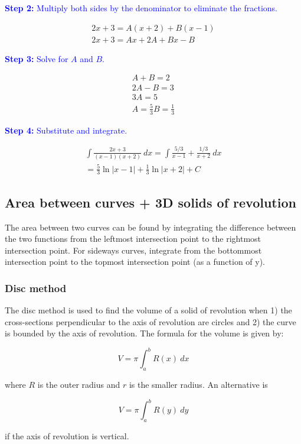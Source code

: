 \documentclass[letterpaper, 12pt]{article}
\newcommand{\step}[2]{\textcolor{blue}{\textbf{Step #1:} #2}}
\begin{document}
\step{2}{Multiply both sides by the denominator to eliminate the fractions.}

\begin{gather*}
2x+3 = A(x+2) + B(x-1) \\
2x + 3 = Ax + 2A + Bx - B
\end{gather*}

\step{3}{Solve for $A$ and $B$.}

\begin{gather*}
A + B = 2 \\
2A - B = 3 \\
3A = 5 \\
A = \frac{5}{3}
B = \frac{1}{3}
\end{gather*}

\step{4}{Substitute and integrate.}

\begin{gather*}
\int \frac{2x + 3}{(x-1)(x+2)} \: dx = \int \frac{5/3}{x-1} + \frac{1/3}{x+2} \: dx \\
= \boxed{\frac{5}{3} \ln|x-1| + \frac{1}{3} \ln|x+2| + C}
\end{gather*}

\subsection*{Area between curves + 3D solids of revolution}

The area between two curves can be found by integrating the difference between the two functions from the leftmost intersection point to the rightmost intersection point. For sideways curves, integrate from the bottommost intersection point to the topmost intersection point (as a function of y).

\subsubsection*{Disc method}

The disc method is used to find the volume of a solid of revolution when 1) the cross-sections perpendicular to the axis of revolution are circles and 2) the curve is bounded by the axis of revolution. The formula for the volume is given by:

$$V = \pi \int_{a}^{b} R(x) \: dx$$

where $R$ is the outer radius and $r$ is the smaller radius. An alternative is 

$$V = \pi \int_{a}^{b} R(y) \: dy$$

if the axis of revolution is vertical.
\end{document}
